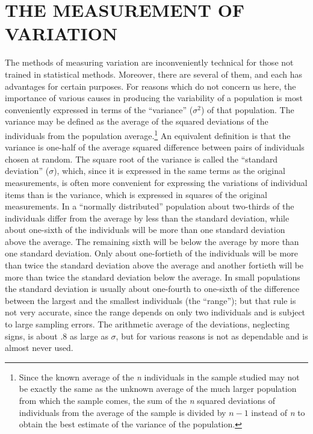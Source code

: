 {\section*{THE MEASUREMENT OF VARIATION}

The methods of measuring variation are inconveniently technical for those not
trained in statistical methods. Moreover, there are several of them, and each
has advantages for certain purposes. For reasons which do not concern us here,
the importance of various causes in producing the variability of a population is
most conveniently expressed in terms of the ``variance'' ($\sigma^2$) of that
population. The variance may be defined as the average of the squared deviations
of the individuals from the population average.\footnote{Since the known average
of the \textit{n} individuals in the sample studied may not be exactly the same as
the unknown average of the much larger population from which the sample comes, the
sum of the \textit{n} squared deviations of individuals from the average of the
sample is divided by $n - 1$ instead of \textit{n} to obtain the best estimate of
the variance of the population.} An equivalent definition is that the variance is
one-half of the average squared difference between pairs of individuals chosen at
random. The square root of the variance is called the ``standard deviation''
($\sigma$), which, since it is expressed in the same terms as the original
measurements, is often more convenient for expressing the variations of individual
items than is the variance, which is expressed in squares of the original
measurements. In a ``normally distributed'' population about two-thirds of the
individuals differ from the average by less than the standard deviation, while
about one-sixth of the individuals will be more than one standard deviation above
the average. The remaining sixth will be below the average by more than one standard
deviation. Only about one-fortieth of the individuals will be more than twice the
standard deviation above the average and another fortieth will be more than twice
the standard deviation below the average. In small populations the standard
deviation is usually about one-fourth to one-sixth of the difference between the
largest and the smallest individuals (the ``range''); but that rule is not very
accurate, since the range depends on only two individuals and is subject to large
sampling errors. The arithmetic average of the deviations, neglecting signs, is
about .8 as large as $\sigma$, but for various reasons is not as dependable and is almost
never used.

}
